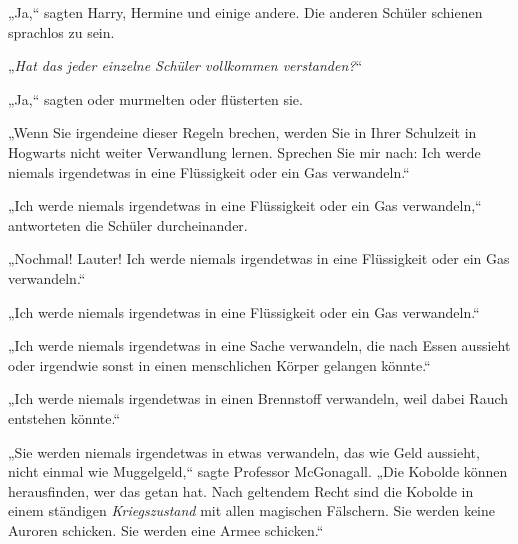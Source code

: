 „Ja,“ sagten Harry, Hermine und einige andere. Die anderen Schüler schienen sprachlos zu sein.

„\emph{Hat das jeder einzelne Schüler vollkommen verstanden?}“

„Ja,“ sagten oder murmelten oder flüsterten sie.

„Wenn Sie irgendeine dieser Regeln brechen, werden Sie in Ihrer Schulzeit in Hogwarts nicht weiter Verwandlung lernen. Sprechen Sie mir nach: Ich werde niemals irgendetwas in eine Flüssigkeit oder ein Gas verwandeln.“

„Ich werde niemals irgendetwas in eine Flüssigkeit oder ein Gas verwandeln,“ antworteten die Schüler durcheinander.

„Nochmal! Lauter! Ich werde niemals irgendetwas in eine Flüssigkeit oder ein Gas verwandeln.“

„Ich werde niemals irgendetwas in eine Flüssigkeit oder ein Gas verwandeln.“

„Ich werde niemals irgendetwas in eine Sache verwandeln, die nach Essen aussieht oder irgendwie sonst in einen menschlichen Körper gelangen könnte.“

„Ich werde niemals irgendetwas in einen Brennstoff verwandeln, weil dabei Rauch entstehen könnte.“

„Sie werden niemals irgendetwas in etwas verwandeln, das wie Geld aussieht, nicht einmal wie Muggelgeld,“ sagte Professor McGonagall. „Die Kobolde können herausfinden, wer das getan hat. Nach geltendem Recht sind die Kobolde in einem ständigen \emph{Kriegszustand} mit allen magischen Fälschern. Sie werden keine Auroren schicken. Sie werden eine Armee schicken.“

